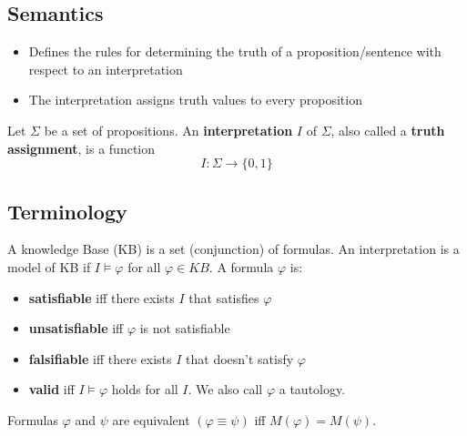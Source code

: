 \documentclass[conference, a4paper]{styles/acmsiggraph}
\begin{document}
    
    \subsection{Semantics}
        \begin{itemize}
            \item Defines the rules for determining the truth of a proposition/sentence with respect to an interpretation
            \item The interpretation assigns truth values to every proposition
        \end{itemize}
        
        Let $\Sigma$ be a set of propositions.
        An \textbf{interpretation} $I$ of $\Sigma$, also called a \textbf{truth assignment}, is a function
        $$I : \Sigma \rightarrow \{ 0,1 \}$$
    
    
    \subsection{Terminology}
        A knowledge Base (KB) is a set (conjunction) of formulas.\newline
        An interpretation is a model of KB if $I \vDash \varphi$ for all $\varphi \in KB$.\newline
        A formula $\varphi$ is:
            \begin{itemize}
                \item \textbf{satisfiable} iff there exists $I$ that satisfies $\varphi$
                \item \textbf{unsatisfiable} iff $\varphi$ is not satisfiable
                \item \textbf{falsifiable} iff there exists $I$ that doesn't satisfy $\varphi$
                \item \textbf{valid} iff $I \vDash \varphi$ holds for all $I$. We also call $\varphi$ a tautology.
            \end{itemize}
        
        Formulas $\varphi$ and $\psi$ are equivalent $(\varphi \equiv \psi)$ iff $M(\varphi) = M(\psi)$.
    
    
\end{document}
